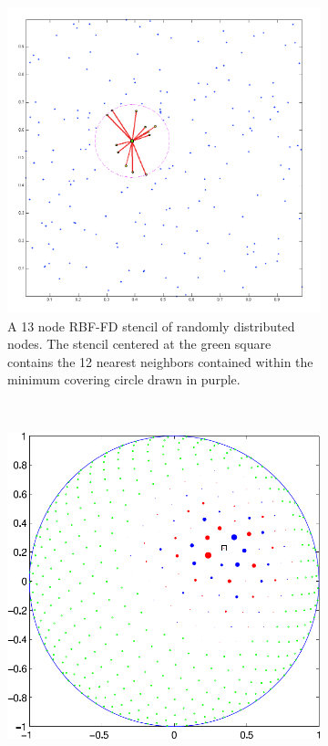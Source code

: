 \documentclass[11pt]{report}
\begin{document}
{\begin{figure}[htbp]
\centering
	\begin{subfigure}[m]{0.55\textwidth}
		\centering
		\includegraphics[width=1.0\textwidth]{../figures/chapter1/preview_stencils_example.png}
		\caption{A 13 node RBF-FD stencil of randomly distributed nodes. The stencil centered at the green square contains the 12 nearest neighbors contained within the minimum covering circle drawn in purple.}
		\label{fig:stencil_example_random}
	\end{subfigure}\ \ \begin{subfigure}[m]{0.35\textwidth}
		\centering
		\includegraphics[width=1.0\textwidth]{../figures/chapter1/RBFFD_single-eps-converted-to.pdf}

\end{subfigure}
\end{figure}}
\end{document}
